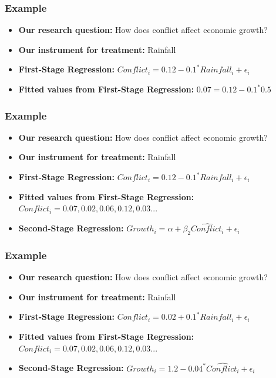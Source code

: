 \documentclass[xcolor=x11names,compress]{beamer}\usepackage[]{graphicx}\usepackage[]{color}
\renewcommand{\(}{\begin{columns}}
\renewcommand{\)}{\end{columns}}
\newcommand{\<}[1]{\begin{column}{#1}}
\renewcommand{\>}{\end{column}}
\begin{document}
\begin{frame}
\frametitle{Example}
\begin{itemize}
\item \textbf{Our research question:} How does conflict affect economic growth?
\item \textbf{Our instrument for treatment:} Rainfall
\item \textbf{First-Stage Regression:} $Conflict_i = 0.12 - 0.1^{*} Rainfall_i + \epsilon_i$
\item \textbf{Fitted values from First-Stage Regression:} $0.07 = 0.12 - 0.1^{*} 0.5$
\end{itemize}
\end{frame}

\begin{frame}
\frametitle{Example}
\begin{itemize}
\item \textbf{Our research question:} How does conflict affect economic growth?
\item \textbf{Our instrument for treatment:} Rainfall
\item \textbf{First-Stage Regression:} $Conflict_i = 0.12 - 0.1^{*} Rainfall_i + \epsilon_i$
\item \textbf{Fitted values from First-Stage Regression:} $\hat{Conflict_i} = 0.07, 0.02, 0.06, 0.12, 0.03...$
\pause
\item \textbf{Second-Stage Regression:} $Growth_i = \alpha + \beta_2 \hat{Conflict_i} + \epsilon_i$
\end{itemize}
\end{frame}

\begin{frame}
\frametitle{Example}
\begin{itemize}
\item \textbf{Our research question:} How does conflict affect economic growth?
\item \textbf{Our instrument for treatment:} Rainfall
\item \textbf{First-Stage Regression:} $Conflict_i = 0.02 + 0.1^{*} Rainfall_i + \epsilon_i$
\item \textbf{Fitted values from First-Stage Regression:} $\hat{Conflict_i} = 0.07, 0.02, 0.06, 0.12, 0.03...$
\item \textbf{Second-Stage Regression:} $Growth_i = 1.2 - 0.04^{*} \hat{Conflict_i} + \epsilon_i$
\end{itemize}
\end{frame}
\end{document}
